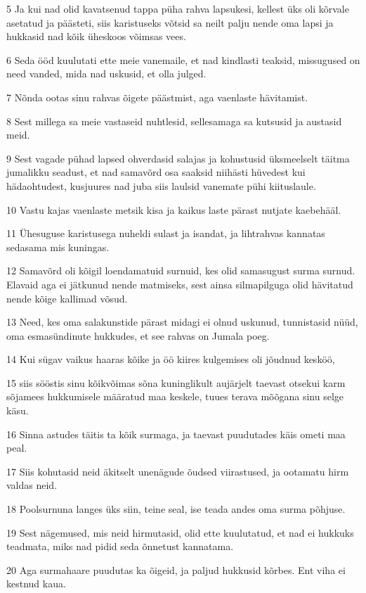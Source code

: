 \par 5 Ja kui nad olid kavatsenud tappa püha rahva lapsukesi, kellest üks oli kõrvale asetatud ja päästeti, siis karistuseks võtsid sa neilt palju nende oma lapsi ja hukkasid nad kõik üheskoos võimsas vees.
\par 6 Seda ööd kuulutati ette meie vanemaile, et nad kindlasti teaksid, missugused on need vanded, mida nad uskusid, et olla julged.
\par 7 Nõnda ootas sinu rahvas õigete päästmist, aga vaenlaste hävitamist.
\par 8 Sest millega sa meie vastaseid nuhtlesid, sellesamaga sa kutsusid ja austasid meid.
\par 9 Sest vagade pühad lapsed ohverdasid salajas ja kohustusid üksmeelselt täitma jumalikku seadust, et nad samavõrd osa saaksid niihästi hüvedest kui hädaohtudest, kusjuures nad juba siis laulsid vanemate pühi kiituslaule.
\par 10 Vastu kajas vaenlaste metsik kisa ja kaikus laste pärast nutjate kaebehääl.
\par 11 Ühesuguse karistusega nuheldi sulast ja isandat, ja lihtrahvas kannatas sedasama mis kuningas.
\par 12 Samavõrd oli kõigil loendamatuid surnuid, kes olid samasugust surma surnud. Elavaid aga ei jätkunud nende matmiseks, sest ainsa silmapilguga olid hävitatud nende kõige kallimad võsud.
\par 13 Need, kes oma salakunstide pärast midagi ei olnud uskunud, tunnistasid nüüd, oma esmasündinute hukkudes, et see rahvas on Jumala poeg.
\par 14 Kui sügav vaikus haaras kõike ja öö kiires kulgemises oli jõudnud kesköö,
\par 15 siis sööstis sinu kõikvõimas sõna kuninglikult aujärjelt taevast otsekui karm sõjamees hukkumisele määratud maa keskele, tuues terava mõõgana sinu selge käsu.
\par 16 Sinna astudes täitis ta kõik surmaga, ja taevast puudutades käis ometi maa peal.
\par 17 Siis kohutasid neid äkitselt unenägude õudsed viirastused, ja ootamatu hirm valdas neid.
\par 18 Poolsurnuna langes üks siin, teine seal, ise teada andes oma surma põhjuse.
\par 19 Sest nägemused, mis neid hirmutasid, olid ette kuulutatud, et nad ei hukkuks teadmata, miks nad pidid seda õnnetust kannatama.
\par 20 Aga surmahaare puudutas ka õigeid, ja paljud hukkusid kõrbes. Ent viha ei kestnud kaua.
